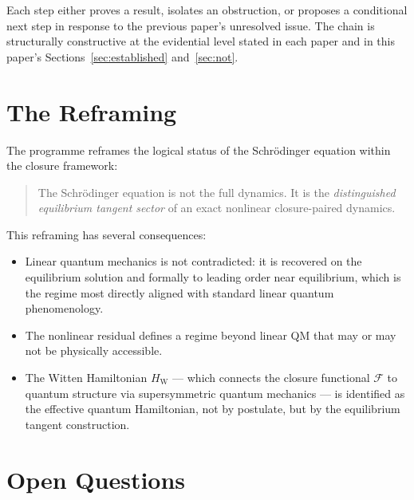 \documentclass[12pt]{article}
\newcommand{\Fcal}{\mathcal{F}}
\newcommand{\HW}{H_{\mathrm{W}}}
\begin{document}
Each step either proves a result, isolates an obstruction, or proposes a conditional next step in response to the previous paper's unresolved issue. The chain is structurally constructive at the evidential level stated in each paper and in this paper's Sections~\ref{sec:established} and~\ref{sec:not}.

\section{The Reframing}\label{sec:reframing}

The programme reframes the logical status of the Schr\"odinger equation within the closure framework:

\begin{quote}
The Schr\"odinger equation is not the full dynamics. It is the \textit{distinguished equilibrium tangent sector} of an exact nonlinear closure-paired dynamics.
\end{quote}

This reframing has several consequences:
\begin{itemize}
    \item Linear quantum mechanics is not contradicted: it is recovered on the equilibrium solution and formally to leading order near equilibrium, which is the regime most directly aligned with standard linear quantum phenomenology.
    \item The nonlinear residual defines a regime beyond linear QM that may or may not be physically accessible.
    \item The Witten Hamiltonian $\HW$ --- which connects the closure functional $\Fcal$ to quantum structure via supersymmetric quantum mechanics --- is identified as the effective quantum Hamiltonian, not by postulate, but by the equilibrium tangent construction.
\end{itemize}

\section{Open Questions}\label{sec:open}
\end{document}
